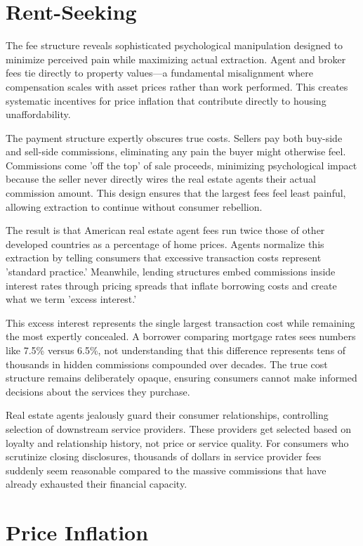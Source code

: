 \section{Rent-Seeking}

The fee structure reveals sophisticated psychological manipulation designed to minimize perceived pain while maximizing actual extraction. Agent and broker fees tie directly to property values---a fundamental misalignment where compensation scales with asset prices rather than work performed. This creates systematic incentives for price inflation that contribute directly to housing unaffordability.

The payment structure expertly obscures true costs. Sellers pay both buy-side and sell-side commissions, eliminating any pain the buyer might otherwise feel. Commissions come 'off the top' of sale proceeds, minimizing psychological impact because the seller never directly wires the real estate agents their actual commission amount. This design ensures that the largest fees feel least painful, allowing extraction to continue without consumer rebellion.

The result is that American real estate agent fees run twice those of other developed countries as a percentage of home prices. Agents normalize this extraction by telling consumers that excessive transaction costs represent 'standard practice.' Meanwhile, lending structures embed commissions inside interest rates through pricing spreads that inflate borrowing costs and create what we term 'excess interest.'

This excess interest represents the single largest transaction cost while remaining the most expertly concealed. A borrower comparing mortgage rates sees numbers like 7.5\% versus 6.5\%, not understanding that this difference represents tens of thousands in hidden commissions compounded over decades. The true cost structure remains deliberately opaque, ensuring consumers cannot make informed decisions about the services they purchase.

Real estate agents jealously guard their consumer relationships, controlling selection of downstream service providers. These providers get selected based on loyalty and relationship history, not price or service quality. For consumers who scrutinize closing disclosures, thousands of dollars in service provider fees suddenly seem reasonable compared to the massive commissions that have already exhausted their financial capacity.

\section{Price Inflation}

